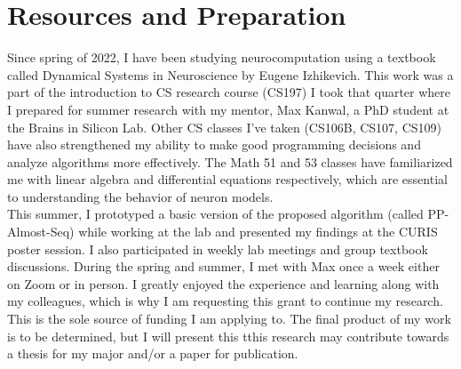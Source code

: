 \documentclass{sigchi}
\begin{document}
\section{Resources and Preparation}
Since spring of 2022, I have been studying neurocomputation using a textbook called Dynamical Systems in Neuroscience by Eugene Izhikevich. This work was a part of the introduction to CS research course (CS197) I took that quarter where I prepared for summer research with my mentor, Max Kanwal, a PhD student at the Brains in Silicon Lab. Other CS classes I've taken (CS106B, CS107, CS109) have also strengthened my ability to make good programming decisions and analyze algorithms more effectively. The Math 51 and 53 classes have familiarized me with linear algebra and differential equations respectively, which are essential to understanding the behavior of neuron models.\\
This summer, I prototyped a basic version of the proposed algorithm (called PP-Almost-Seq) while working at the lab and presented my findings at the CURIS poster session. I also participated in weekly lab meetings and group textbook discussions. During the spring and summer, I met with Max once a week either on Zoom or in person. I greatly enjoyed the experience and learning along with my colleagues, which is why I am requesting this grant to continue my research. This is the sole source of funding I am applying to. The final product of my work is to be determined, but I will present this tthis research may contribute towards a thesis for my major and/or a paper for publication.
\end{document}
